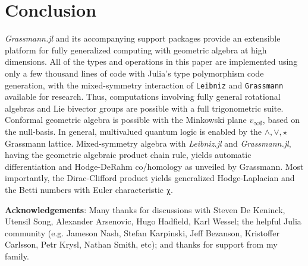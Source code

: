 \documentclass{juliacon}
\begin{document}
\section{Conclusion}

\textit{Grassmann.jl} and its accompanying support packages provide an extensible platform for fully generalized computing with geometric algebra at high dimensions.
All of the types and operations in this paper are implemented using only a few thousand lines of code with Julia's type polymorphism code generation, with the mixed-symmetry interaction of \verb`Leibniz` and \verb`Grassmann` available for research.
Thus, computations involving fully general rotational algebras and Lie bivector groups are possible with a full trigonometric suite. %
Conformal geometric algebra is possible with the Minkowski plane $v_{\infty\emptyset}$, based on the null-basis.
In general, multivalued quantum logic is enabled by the $\wedge,\vee,\star$ Grassmann lattice.
Mixed-symmetry algebra with \textit{Leibniz.jl} and \textit{Grassmann.jl}, having the geometric algebraic product chain rule, yields automatic differentiation and Hodge-DeRahm co/homology  as unveiled by Grassmann.
Most importantly, the Dirac-Clifford product yields generalized Hodge-Laplacian and the Betti numbers with Euler characteristic \verb`χ`.

\textbf{Acknowledgements}: Many thanks for discussions with Steven De Keninck, Utensil Song, Alexander Arsenovic, Hugo Hadfield, Karl Wessel; the helpful Julia community (e.g. Jameson Nash, Stefan Karpinski, Jeff Bezanson, Kristoffer Carlsson, Petr Krysl, Nathan Smith, etc); and thanks for support from my family.

\end{document}
